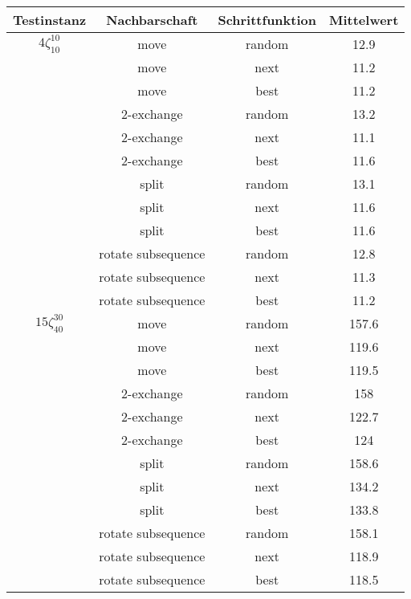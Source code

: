 \documentclass[a4paper,10pt]{article}
\begin{document}
\begin{tabular}{cccc}
\hline
Testinstanz & Nachbarschaft & Schrittfunktion & Mittelwert \\
\hline
$4\zeta_{10}^{10}$ & move & random &  12.9 \\
							 		& move & next &  11.2 \\
									& move & best &  11.2 \\
							 		& 2-exchange & random &  13.2 \\
							 		& 2-exchange & next &  11.1 \\
									& 2-exchange & best &  11.6 \\
							 		& split & random &  13.1 \\
							 		& split & next &  11.6 \\
									& split & best &  11.6 \\
							 		& rotate subsequence & random &  12.8 \\
							 		& rotate subsequence & next &  11.3 \\
									& rotate subsequence & best &  11.2 \\
\hline									
$15\zeta_{40}^{30}$ & move & random &  157.6 \\
							 		& move & next &  119.6 \\
									& move & best &  119.5 \\
							 		& 2-exchange & random &  158 \\
							 		& 2-exchange & next &  122.7 \\
									& 2-exchange & best &  124 \\
							 		& split & random &  158.6 \\
							 		& split & next &  134.2 \\
									& split & best &  133.8 \\
							 		& rotate subsequence & random &  158.1 \\
							 		& rotate subsequence & next &  118.9 \\
									& rotate subsequence & best &  118.5 \\
\hline									
\end{tabular}
\end{document}
